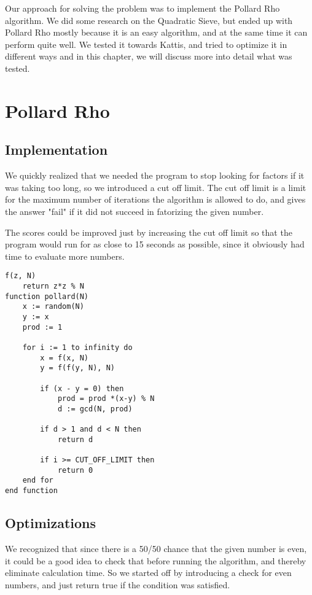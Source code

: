 \documentclass[a4paper, 12pt]{report}
\begin{document}
Our approach for solving the problem was to implement the Pollard Rho algorithm. We did some research on the Quadratic Sieve, but ended up with Pollard Rho mostly because it is an easy algorithm, and at the same time it can perform quite well. We tested it towards Kattis, and tried to optimize it in different ways and in this chapter, we will discuss more into detail what was tested.

\section{Pollard Rho}
\subsection{Implementation}

We quickly realized that we needed the program to stop looking for factors if it was taking too long, so we introduced a cut off limit. The cut off limit is a limit for the maximum number of iterations the algorithm is allowed to do, and gives the answer "fail" if it did not succeed in fatorizing the given number. 

The scores could be improved just by increasing the cut off limit so that the program would run for as close to 15 seconds as possible, since it obviously had time to evaluate more numbers.

\begin{lstlisting}[frame=single] 
f(z, N)
	return z*z % N
function pollard(N) 
	x := random(N) 
	y := x 	
	prod := 1

	for i := 1 to infinity do
		x = f(x, N)
		y = f(f(y, N), N)

		if (x - y = 0) then
			prod = prod *(x-y) % N
			d := gcd(N, prod)

		if d > 1 and d < N then
			return d

		if i >= CUT_OFF_LIMIT then
			return 0
	end for
end function
\end{lstlisting}

\subsection{Optimizations}
We recognized that since there is a 50/50 chance that the given number is even, it could be a good idea to check that before running the algorithm, and thereby eliminate calculation time. So we started off by introducing a check for even numbers, and just return true if the condition was satisfied.
\end{document}

